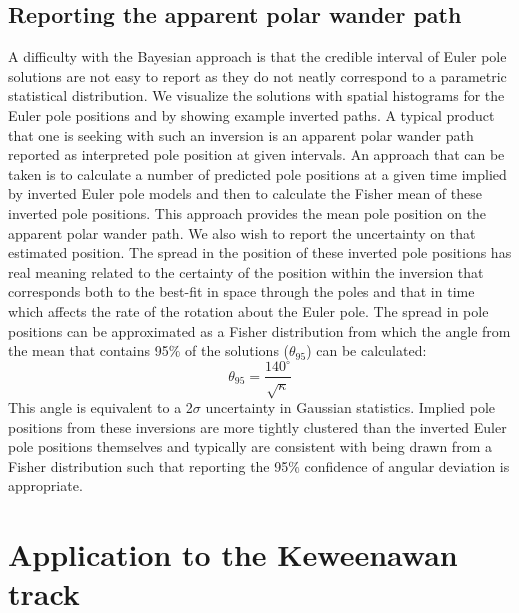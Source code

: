 \documentclass[11pt,letterpaper]{article}
\begin{document}
\subsection*{Reporting the apparent polar wander path}
\label{sec:age_uncertainty}
A difficulty with the Bayesian approach is that the credible interval of Euler pole solutions are not easy to report as they do not neatly correspond to a parametric statistical distribution. We visualize the solutions with spatial histograms for the Euler pole positions and by showing example inverted paths. A typical product that one is seeking with such an inversion is an apparent polar wander path reported as interpreted pole position at given intervals. An approach that can be taken is to calculate a number of predicted pole positions at a given time implied by inverted Euler pole models and then to calculate the Fisher mean of these inverted pole positions. This approach provides the mean pole position on the apparent polar wander path. We also wish to report the uncertainty on that estimated position. The spread in the position of these inverted pole positions has real meaning related to the certainty of the position within the inversion that corresponds both to the best-fit in space through the poles and that in time which affects the rate of the rotation about the Euler pole. The spread in pole positions can be approximated as a Fisher distribution from which the angle from the mean that contains 95$\%$ of the solutions ($\theta_{95}$) can be calculated:
\begin{equation}
\theta_{95}=\frac{140^{\circ}}{\sqrt{\kappa}}
\label{eq:angular_deviation}
\end{equation}
This angle is equivalent to a 2$\sigma$ uncertainty in Gaussian statistics. Implied pole positions from these inversions are more tightly clustered than the inverted Euler pole positions themselves and typically are consistent with being drawn from a Fisher distribution such that reporting the 95$\%$ confidence of angular deviation is appropriate.

\section*{Application to the Keweenawan track}
\label{sec:keweenawan}
\end{document}
